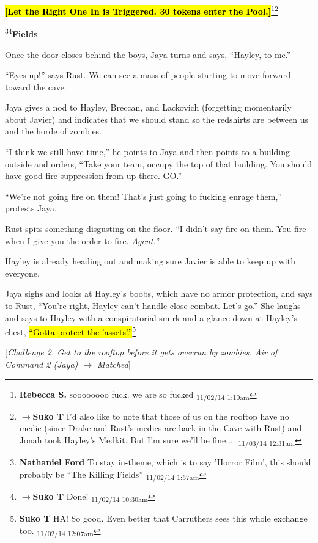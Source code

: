 \textbf{\hl{{[}Let the Right One In is Triggered.  30 tokens enter the Pool.{]}}}\footnote{\textbf{Rebecca S. }soooooooo fuck.
we are so fucked \textsubscript{11/02/14 1:10am}}\footnote{$\rightarrow$\textbf{Suko T }I'd also like to note that those of us on the rooftop have no medic (since Drake and Rust's medics are back in the Cave with Rust) and Jonah took Hayley's Medkit.  But I'm sure we'll be fine.... \textsubscript{11/03/14 12:31am}}




\footnote{\textbf{Nathaniel Ford }To stay in-theme, which is to say 'Horror Film', this should probably be ``The Killing Fields'' \textsubscript{11/02/14 1:57am}}\footnote{$\rightarrow$\textbf{Suko T }Done! \textsubscript{11/02/14 10:30am}}\textbf{Fields}

Once the door closes behind the boys, Jaya turns and says, ``Hayley, to me.''

``Eyes up!'' says Rust.  We can see a mass of people starting to move forward toward the cave.

Jaya gives a nod to Hayley, Breccan, and Lackovich (forgetting momentarily about Javier) and indicates that we should stand so the redshirts are between us and the horde of zombies.

``I think we still have time,'' he points to Jaya and then points to a building outside and orders,  ``Take your team, occupy the top of that building.  You should have good fire suppression from up there.  GO.''

``We're not going fire on them!  That's just going to fucking enrage them,'' protests Jaya.

Rust spits something disgusting on the floor.  ``I didn't say fire on them.  You fire when I give you the order to fire.  \textit{Agent.}''

Hayley is already heading out and making sure Javier is able to keep up with everyone.

Jaya sighs and looks at Hayley's boobs, which have no armor protection, and says to Rust, ``You're right, Hayley can't handle close combat.  Let's go.''  She laughs and says to Hayley with a conspiratorial smirk and a glance down at Hayley's chest, \hl{``Gotta protect the 'assets'.''}\footnote{\textbf{Suko T }HA!  So good. Even better that Carruthers sees this whole exchange too. \textsubscript{11/02/14 12:07am}}

{[}\textit{Challenge 2.  Get to the rooftop before it gets overrun by zombies.  Air of Command 2 (Jaya) $\rightarrow$ Matched}{]}

